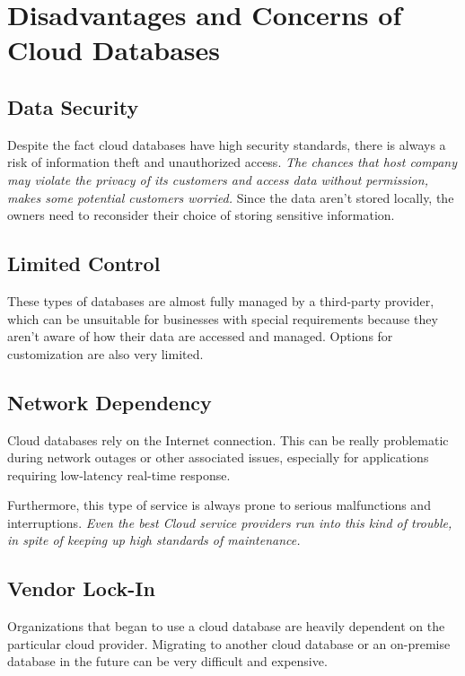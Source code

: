 \documentclass[12pt, a4paper]{article}
\begin{document}
\section{Disadvantages and Concerns of Cloud Databases}
    \subsection{Data Security}
        Despite the fact cloud databases have high security standards, there is always a risk of information theft and unauthorized access. \textit{The chances that host company may violate the privacy of its customers and access data without permission, makes some potential customers worried.}\cite{02} Since the data aren't stored locally, the owners need to reconsider their choice of storing sensitive information.

    \subsection{Limited Control}
        These types of databases are almost fully managed by a third-party provider, which can be unsuitable for businesses with special requirements because they aren't aware of how their data are accessed and managed. Options for customization are also very limited.
        
    \subsection{Network Dependency}
        Cloud databases rely on the Internet connection. This can be really problematic during network outages or other associated issues, especially for applications requiring low-latency real-time response.\par Furthermore, this type of service is always prone to serious malfunctions and interruptions. \textit{Even the best Cloud service providers run into this kind of trouble, in spite of keeping up high standards of maintenance.}\cite{14}
        
    \subsection{Vendor Lock-In}
        Organizations that began to use a cloud database are heavily dependent on the particular cloud provider. Migrating to another cloud database or an on-premise database in the future can be very difficult and expensive.
\end{document}
